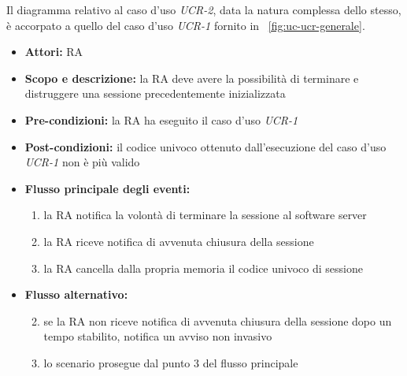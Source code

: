 
Il diagramma relativo al caso d'uso \emph{UCR-2}, data la natura complessa dello stesso, è accorpato a quello del caso d'uso \emph{UCR-1} fornito in \figurename~\ref{fig:uc-ucr-generale}.

\begin{itemize}
	\item \textbf{Attori:} RA
	\item \textbf{Scopo e descrizione:} la RA deve avere la possibilità di terminare e distruggere una sessione precedentemente inizializzata
	\item \textbf{Pre-condizioni:} la RA ha eseguito il caso d'uso \emph{UCR-1}
	\item \textbf{Post-condizioni:} il codice univoco ottenuto dall'esecuzione del caso d'uso \emph{UCR-1} non è più valido
	\item \textbf{Flusso principale degli eventi:}
		\begin{enumerate}
			\item la RA notifica la volontà di terminare la sessione al software server
			\item la RA riceve notifica di avvenuta chiusura della sessione
			\item la RA cancella dalla propria memoria il codice univoco di sessione
		\end{enumerate}
	\item \textbf{Flusso alternativo:}
		\begin{enumerate}
			\setcounter{enumi}{1}
			\item se la RA non riceve notifica di avvenuta chiusura della sessione dopo un tempo stabilito, notifica un avviso non invasivo
			\item lo scenario prosegue dal punto 3 del flusso principale
		\end{enumerate}
\end{itemize}
